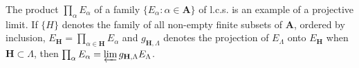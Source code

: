 The product $\prod_{\alpha} E_{\alpha}$ of a family $\{E_{\alpha}: \alpha \in \mathbf{A}\}$ of l.c.s. is an example of a projective limit. If $\{H\}$ denotes the family of all non-empty finite subsets of $\mathbf{A}$, ordered by inclusion, $E_{\mathbf{H}} = \prod_{\alpha \in \mathbf{H}} E_{\alpha}$ and $g_{\mathbf{H}, \Lambda}$ denotes the projection of $E_{\Lambda}$ onto $E_{\mathbf{H}}$ when $\mathbf{H} \subset \Lambda$, then $\prod_{\alpha} E_{\alpha} = \varprojlim g_{\mathbf{H}, \Lambda} E_{\Lambda}$.
